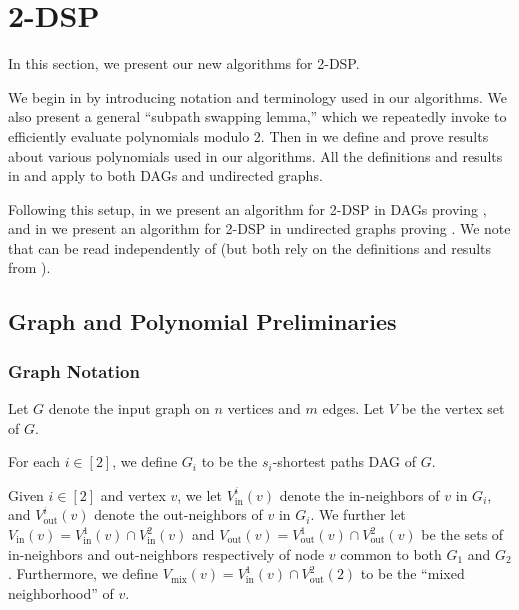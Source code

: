\documentclass[11pt]{article}
\renewcommand{\t}{\text}
\newcommand{\vin}{V_{\t{in}}}
\newcommand{\vout}{V_{\t{out}}}
\newcommand{\vmix}{V_{\t{mix}}}
\theoremstyle{definition}
\begin{document}



\section{2-DSP}
\label{sec:2dsp}

In this section, we present our new algorithms for \textsf{2-DSP}.

We begin in  by introducing notation and terminology used in our algorithms.
We also present a general ``subpath swapping lemma,'' which we repeatedly invoke to efficiently evaluate polynomials modulo 2.
Then in  we define and prove results about various  polynomials used in our algorithms.
All the definitions and results in  and  apply to both DAGs and undirected graphs.

Following this setup, in  we present an algorithm for \textsf{2-DSP} in DAGs proving , and in  we present an algorithm for \textsf{2-DSP} in undirected graphs proving .
We note that
 can be read independently of  (but both 
rely on the definitions and results from ).

\subsection{Graph and Polynomial Preliminaries}
\label{subsec:alg-prelim}

\subsubsection*{Graph Notation}
Let $G$ denote the input graph on $n$ vertices and $m$ edges.
Let $V$ be the vertex set of $G$.

For each $i\in [2]$, we define $G_i$ to be the $s_i$-shortest paths DAG of $G$.

Given $i\in [2]$ and vertex $v$, we let $V_{\text{in}}^{i}(v)$ denote the in-neighbors of $v$ in $G_i$, and $\vout^i(v)$ denote the out-neighbors of $v$ in $G_i$.
We further let $\vin(v) = \vin^1(v)\cap \vin^2(v)$ and $\vout(v) = \vout^1(v)\cap \vout^2(v)$ be the sets of in-neighbors and out-neighbors respectively of node $v$ common to both $G_1$ and $G_2$.
Furthermore, we define $\vmix(v) = \vin^1(v)\cap \vout^2(2)$ to be the ``mixed neighborhood'' of $v$. 
\end{document}
